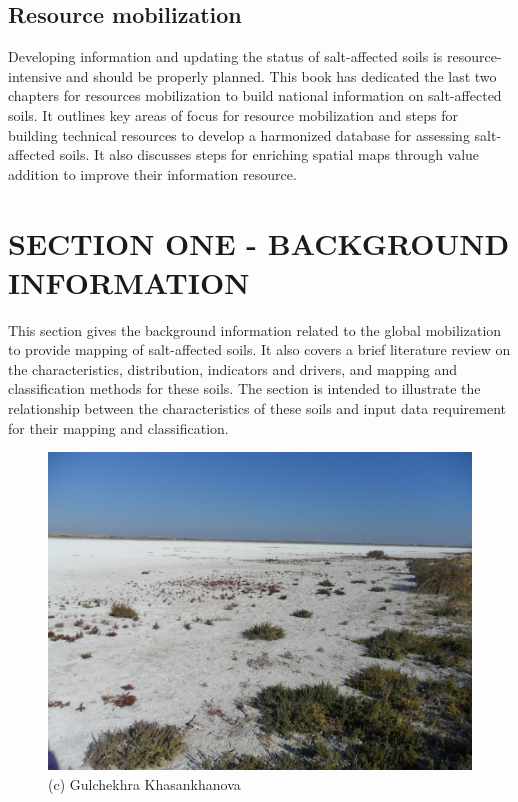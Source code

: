 \documentclass[
  10pt,
  b5paper,
]{book}
\begin{document}
\hypertarget{resource-mobilization}{%
\section*{Resource mobilization}\label{resource-mobilization}}

Developing information and updating the status of salt-affected soils is resource-intensive and should be
properly planned. This book has dedicated the last two chapters for resources mobilization to build
national information on salt-affected soils. It outlines key areas of focus for resource mobilization and
steps for building technical resources to develop a harmonized database for assessing salt-affected soils.
It also discusses steps for enriching spatial maps through value addition to improve their information
resource.

\hypertarget{section-one---background-information}{%
\chapter*{SECTION ONE - BACKGROUND INFORMATION}\label{section-one---background-information}}

This section gives the background information related to the global mobilization to provide mapping of
salt-affected soils. It also covers a brief literature review on the characteristics, distribution, indicators and
drivers, and mapping and classification methods for these soils. The section is intended to illustrate the
relationship between the characteristics of these soils and input data requirement for their mapping and
classification.

\begin{figure}
\centering
\includegraphics{figures/images/SAM_1351.jpg}
\caption{(c) Gulchekhra Khasankhanova}
\end{figure}
\end{document}
